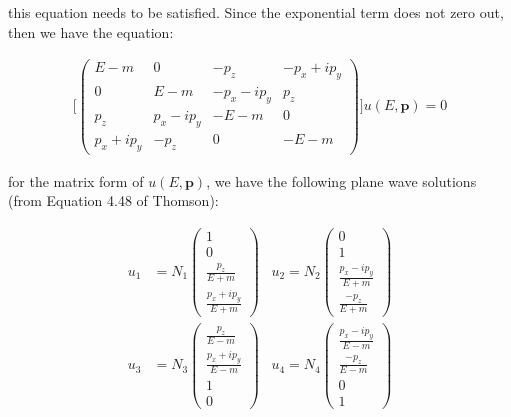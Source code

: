 \documentclass[11pt]{article}
\theoremstyle{definition}
\begin{document}
this equation needs to be satisfied. Since the exponential term does not zero out, then we have the equation:

\begin{align}\label{condition}
    \biggl[
        \begin{pmatrix}
            E-m & 0 & -p_{z} & - p_{x} + ip_{y}\\
            0 & E-m & - p_{x} - ip_{y} & p_{z}\\
            p_{z} & p_{x} - ip_{y} & -E-m & 0\\
            p_{x} + ip_{y} & -p_{z} & 0 & -E-m
        \end{pmatrix}
    \biggr]
    u(E,\mathbf{p})  = 0
\end{align}


for the matrix form of $u(E,\mathbf{p})$, we have the following plane wave solutions (from Equation 4.48 of Thomson):

\begin{align*}
    u_1 &= N_1
            \begin{pmatrix}
                1\\
                0\\
                \frac{p_z}{E+m}\\
                \frac{p_x + ip_y}{E+m}
            \end{pmatrix}
            \;\;\;
    u_2 = N_2
            \begin{pmatrix}
                0\\
                1\\
                \frac{p_x - ip_y}{E+m}\\
                \frac{-p_z}{E+m}
            \end{pmatrix}\\
    u_3 &= N_3
            \begin{pmatrix}
                \frac{p_z}{E-m}\\
                \frac{p_x + ip_y}{E-m}\\
                1\\
                0
            \end{pmatrix}
            \;\;\;
    u_4 = N_4
            \begin{pmatrix}
                \frac{p_x - ip_y}{E-m}\\
                \frac{-p_z}{E-m}\\
                0\\
                1
            \end{pmatrix}\\
\end{align*}
\end{document}
